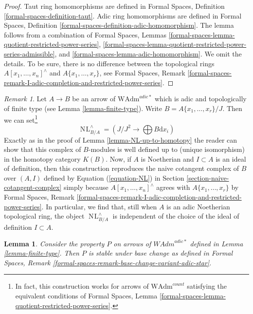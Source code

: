 \documentclass{stacks-project}
\theoremstyle{plain}
\newtheorem{lemma}[subsection]{Lemma}
\theoremstyle{definition}
\theoremstyle{remark}
\newtheorem{remark}[subsection]{Remark}
\numberwithin{equation}{subsection}
\def\NL{\mathop{N\!L}\nolimits}
\begin{document}
\begin{proof}
Taut ring homomorphisms are defined in
Formal Spaces, Definition \ref{formal-spaces-definition-taut}.
Adic ring homomorphisms are defined in
Formal Spaces, Definition
\ref{formal-spaces-definition-adic-homomorphism}.
The lemma follows from a combination of
Formal Spaces, Lemmas
\ref{formal-spaces-lemma-quotient-restricted-power-series},
\ref{formal-spaces-lemma-quotient-restricted-power-series-admissible}, and
\ref{formal-spaces-lemma-adic-homomorphism}. We omit the details.
To be sure, there is no difference between the topological rings
$A[x_1, \ldots, x_n]^\wedge$ and $A\{x_1, \ldots, x_r\}$, see
Formal Spaces, Remark
\ref{formal-spaces-remark-I-adic-completion-and-restricted-power-series}.
\end{proof}

\begin{remark}
\label{remark-NL-well-defined-topological}
Let $A \to B$ be an arrow of $\text{WAdm}^{adic*}$ which is adic and
topologically of finite type (see Lemma \ref{lemma-finite-type}). Write
$B = A\{x_1, \ldots, x_r\}/J$. Then we can set\footnote{In fact, this
construction works for arrows of $\text{WAdm}^{count}$ satisfying the
equivalent conditions of Formal Spaces, Lemma
\ref{formal-spaces-lemma-quotient-restricted-power-series}.}
$$
\NL_{B/A}^\wedge = \left(J/J^2 \longrightarrow \bigoplus B\text{d}x_i\right)
$$
Exactly as in the proof of Lemma \ref{lemma-NL-up-to-homotopy}
the reader can show that this complex of $B$-modules is
well defined up to (unique isomorphism) in the homotopy category $K(B)$.
Now, if $A$ is Noetherian and $I \subset A$ is an ideal of definition,
then this construction reproduces the naive cotangent complex
of $B$ over $(A, I)$ defined by Equation (\ref{equation-NL})
in Section \ref{section-naive-cotangent-complex} simply because
$A[x_1, \ldots, x_n]^\wedge$ agrees with $A\{x_1, \ldots, x_r\}$ by
Formal Spaces, Remark
\ref{formal-spaces-remark-I-adic-completion-and-restricted-power-series}.
In particular, we find that, still when $A$ is an adic Noetherian
topological ring, the object $\NL_{B/A}^\wedge$ is independent
of the choice of the ideal of definition $I \subset A$.
\end{remark}

\begin{lemma}
\label{lemma-base-change-finite-type}
Consider the property $P$ on arrows of $\textit{WAdm}^{adic*}$ defined in
Lemma \ref{lemma-finite-type}. Then $P$ is stable under base change as
defined in Formal Spaces, Remark
\ref{formal-spaces-remark-base-change-variant-adic-star}.
\end{lemma}
\end{document}
